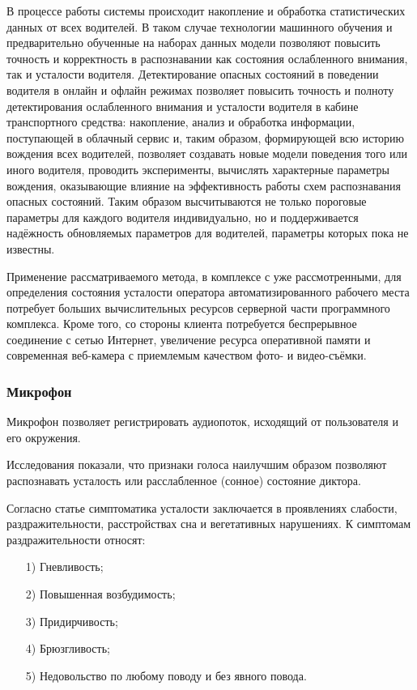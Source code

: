 В процессе работы системы происходит накопление и обработка статистических данных от всех водителей. В таком случае технологии машинного обучения и предварительно обученные на наборах данных модели позволяют повысить точность и корректность в распознавании как состояния ослабленного внимания, так и усталости водителя. Детектирование опасных состояний в поведении водителя в онлайн и офлайн режимах позволяет повысить точность и полноту детектирования ослабленного внимания и усталости водителя в кабине транспортного средства: накопление, анализ и обработка информации, поступающей в облачный сервис и, таким образом, формирующей всю историю вождения всех водителей, позволяет создавать новые модели поведения того или иного водителя, проводить эксперименты, вычислять характерные параметры вождения, оказывающие влияние на эффективность работы схем распознавания опасных состояний. Таким образом высчитываются не только пороговые параметры для каждого водителя индивидуально, но и поддерживается надёжность обновляемых параметров для водителей, параметры которых пока не известны. \cite{videoMethod}

Применение рассматриваемого метода, в комплексе с уже рассмотренными, для определения состояния усталости оператора автоматизированного рабочего места потребует больших вычислительных ресурсов серверной части программного комплекса. Кроме того, со стороны клиента потребуется беспрерывное соединение с сетью Интернет, увеличение ресурса оперативной памяти и современная веб-камера с приемлемым качеством фото- и видео-съёмки.

\subsubsection{Микрофон}
Микрофон позволяет регистрировать аудиопоток, исходящий от пользователя и его окружения.

Исследования \cite{recognitionOfPsycho} показали, что признаки голоса наилучшим образом позволяют распознавать усталость или расслабленное (сонное) состояние диктора. 

Согласно статье \cite{medObozr} симптоматика усталости заключается в проявлениях слабости, раздражительности, расстройствах сна и вегетативных нарушениях. К симптомам раздражительности относят:
\begin{itemize}[leftmargin=1.6\parindent]
\item[1)] Гневливость;
\item[2)] Повышенная возбудимость;
\item[3)] Придирчивость;
\item[4)] Брюзгливость;
\item[5)] Недовольство по любому поводу и без явного повода.
\end{itemize}


